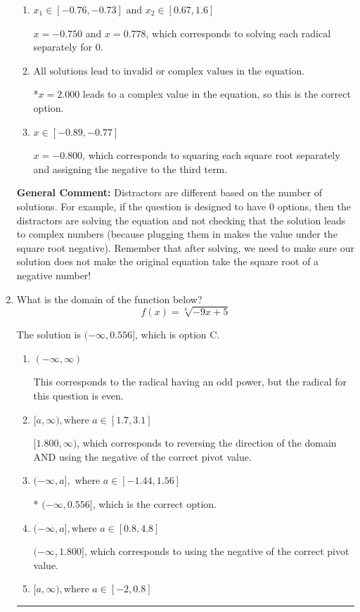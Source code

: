 \documentclass{extbook}[14pt]
\newcommand{\litem}[1]{\item #1

\rule{\textwidth}{0.4pt}}
\begin{document}
\begin{enumerate}
{\begin{enumerate}[label=\Alph*.]
This corresponds to not checking that the potential solution $x = 2.000$ leads to a complex value in the original equation.
\item \( x_1 \in [-0.76, -0.73] \text{ and } x_2 \in [0.67,1.6] \)

$x = -0.750$ and $x = 0.778$, which corresponds to solving each radical separately for 0.
\item \( \text{All solutions lead to invalid or complex values in the equation.} \)

*$x = 2.000$ leads to a complex value in the equation, so this is the correct option.
\item \( x \in [-0.89,-0.77] \)

$x = -0.800$, which corresponds to squaring each square root separately and assigning the negative to the third term.
\end{enumerate}

\textbf{General Comment:} Distractors are different based on the number of solutions. For example, if the question is designed to have 0 options, then the distractors are solving the equation and not checking that the solution leads to complex numbers (because plugging them in makes the value under the square root negative). Remember that after solving, we need to make sure our solution does not make the original equation take the square root of a negative number!
}
\litem{
What is the domain of the function below?
\[ f(x) = \sqrt[8]{-9 x + 5} \]

The solution is \( (-\infty, 0.556] \), which is option C.\begin{enumerate}[label=\Alph*.]
\item \( (-\infty, \infty) \)

This corresponds to the radical having an odd power, but the radical for this question is even.
\item \( [a, \infty), \text{where } a \in [1.7, 3.1] \)

$[1.800, \infty)$, which corresponds to reversing the direction of the domain AND using the negative of the correct pivot value.
\item \( (-\infty, a], \text{ where } a \in [-1.44, 1.56] \)

* $(-\infty, 0.556]$, which is the correct option.
\item \( (-\infty, a], \text{where } a \in [0.8, 4.8] \)

$(-\infty, 1.800]$, which corresponds to using the negative of the correct pivot value.
\item \( [a, \infty), \text{where } a \in [-2, 0.8] \)


\end{enumerate}}
\end{enumerate}
\end{document}
